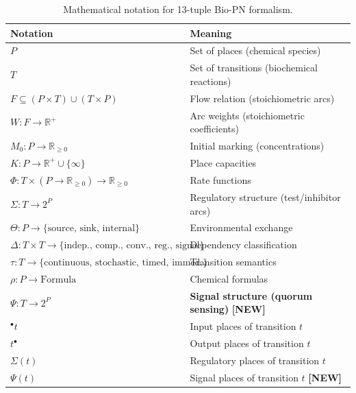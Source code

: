 \documentclass[11pt]{article}
\newcommand{\preset}[1]{{\ensuremath{^{\bullet}#1}}}
\newcommand{\postset}[1]{{\ensuremath{#1^{\bullet}}}}
\newcommand{\RegSet}[1]{{\Sigma(#1)}}
\newcommand{\SignalSet}[1]{{\Psi(#1)}}
\begin{document}
\begin{table}[h]
\centering
\begin{tabular}{ll}
\hline
\textbf{Notation} & \textbf{Meaning} \\
\hline
$P$ & Set of places (chemical species) \\
$T$ & Set of transitions (biochemical reactions) \\
$F \subseteq (P \times T) \cup (T \times P)$ & Flow relation (stoichiometric arcs) \\
$W: F \to \mathbb{R}^+$ & Arc weights (stoichiometric coefficients) \\
$M_0: P \to \mathbb{R}_{\geq 0}$ & Initial marking (concentrations) \\
$K: P \to \mathbb{R}^+ \cup \{\infty\}$ & Place capacities \\
$\Phi: T \times (P \to \mathbb{R}_{\geq 0}) \to \mathbb{R}_{\geq 0}$ & Rate functions \\
$\Sigma: T \to 2^P$ & Regulatory structure (test/inhibitor arcs) \\
$\Theta: P \to \{\text{source, sink, internal}\}$ & Environmental exchange \\
$\Delta: T \times T \to \{\text{indep., comp., conv., reg., signal}\}$ & Dependency classification \\
$\tau: T \to \{\text{continuous, stochastic, timed, immed.}\}$ & Transition semantics \\
$\rho: P \to \text{Formula}$ & Chemical formulas \\
$\Psi: T \to 2^P$ & \textbf{Signal structure (quorum sensing)} \textbf{[NEW]} \\
\hline
$\preset{t}$ & Input places of transition $t$ \\
$\postset{t}$ & Output places of transition $t$ \\
$\RegSet{t}$ & Regulatory places of transition $t$ \\
$\SignalSet{t}$ & Signal places of transition $t$ \textbf{[NEW]} \\
\hline
\end{tabular}
\caption{Mathematical notation for 13-tuple Bio-PN formalism.}
\end{table}
\end{document}
